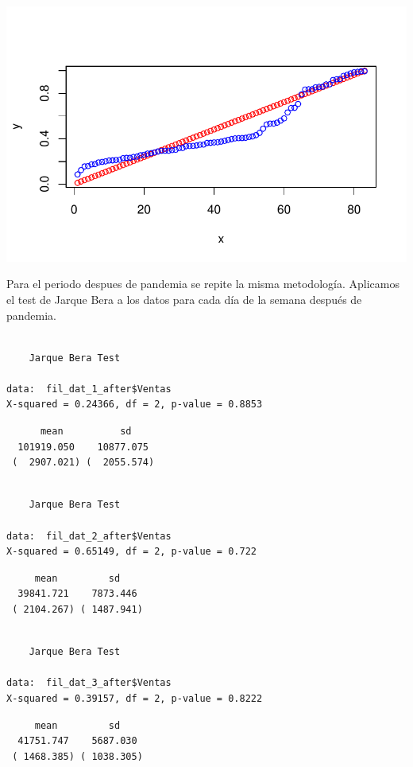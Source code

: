 \documentclass[
  us-letterpaper,
]{scrreprt}
\theoremstyle{plain}
\theoremstyle{plain}
\theoremstyle{definition}
\theoremstyle{remark}
\begin{document}
\includegraphics{Estudio_caso_files/figure-pdf/unnamed-chunk-27-3.pdf}

Para el periodo despues de pandemia se repite la misma metodología.
Aplicamos el test de Jarque Bera a los datos para cada día de la semana
después de pandemia.

\begin{verbatim}

    Jarque Bera Test

data:  fil_dat_1_after$Ventas
X-squared = 0.24366, df = 2, p-value = 0.8853
\end{verbatim}

\begin{verbatim}
      mean          sd    
  101919.050    10877.075 
 (  2907.021) (  2055.574)
\end{verbatim}

\begin{verbatim}

    Jarque Bera Test

data:  fil_dat_2_after$Ventas
X-squared = 0.65149, df = 2, p-value = 0.722
\end{verbatim}

\begin{verbatim}
     mean         sd    
  39841.721    7873.446 
 ( 2104.267) ( 1487.941)
\end{verbatim}

\begin{verbatim}

    Jarque Bera Test

data:  fil_dat_3_after$Ventas
X-squared = 0.39157, df = 2, p-value = 0.8222
\end{verbatim}

\begin{verbatim}
     mean         sd    
  41751.747    5687.030 
 ( 1468.385) ( 1038.305)
\end{verbatim}
\end{document}
